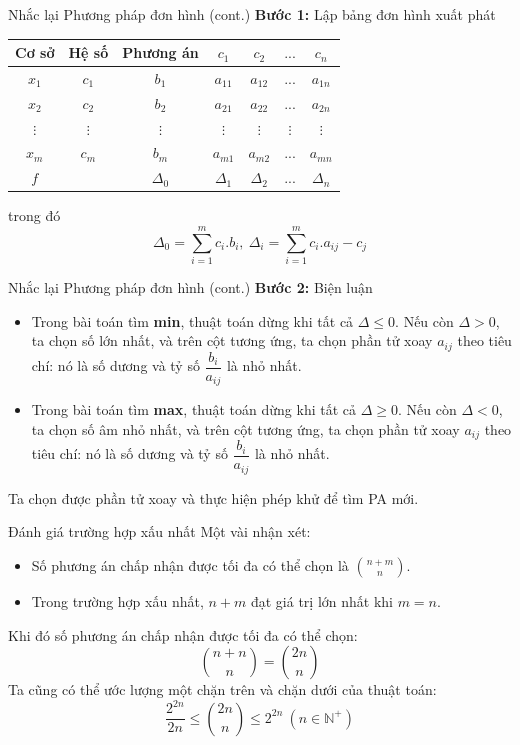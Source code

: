 \documentclass[10pt]{beamer}
\begin{document}
\begin{frame}{Nhắc lại Phương pháp đơn hình (cont.)}
\textbf{Bước 1:} Lập bảng đơn hình xuất phát
\begin{table}[H]
\centering
\begin{tabular}{|c|c|c|c|c|c|c|}
\hline
Cơ sở & Hệ số & Phương án & $c_1$ & $c_2$ & $...$ & $c_n$\\
\hline
$x_1$ & $c_1$ & $b_1$ & $a_{11}$ & $a_{12}$ & $...$ & $a_{1n}$ \\
$x_2$ & $c_2$ & $b_2$ & $a_{21}$ & $a_{22}$ & $...$ & $a_{2n}$ \\
$\vdots$ & $\vdots$ & $\vdots$ & $\vdots$ & $\vdots$ & $\vdots$ & $\vdots$\\
$x_m$ & $c_m$ & $b_m$ & $a_{m1}$ & $a_{m2}$ & $...$ & $a_{mn}$\\
\hline
$f$ & & $\Delta_0$ & $\Delta_1$ & $\Delta_2$ & $...$ & $\Delta_n$ \\
\hline
\end{tabular}
\end{table}
trong đó
$$
\Delta_0 = \sum^{m}_{i=1}c_{i}.b_i,\ \Delta_i = \sum^{m}_{i=1}c_i.a_{ij} - c_j
$$

\end{frame}

\begin{frame}{Nhắc lại Phương pháp đơn hình (cont.)}
\textbf{Bước 2:} Biện luận
\begin{itemize}
\item Trong bài toán tìm \textbf{min}, thuật toán dừng khi tất cả $\Delta \leq 0$. Nếu còn $\Delta > 0$, ta chọn số lớn nhất, và trên cột tương ứng, ta chọn phần tử xoay $a_{ij}$ theo tiêu chí: nó là số dương và tỷ số $\dfrac{b_{i}}{a_{ij}}$ là nhỏ nhất.
\item Trong bài toán tìm \textbf{max}, thuật toán dừng khi tất cả $\Delta \geq 0$. Nếu còn $\Delta < 0$, ta chọn số âm nhỏ nhất, và trên cột tương ứng, ta chọn phần tử xoay $a_{ij}$ theo tiêu chí: nó là số dương và tỷ số $\dfrac{b_{i}}{a_{ij}}$ là nhỏ nhất.
\end{itemize}
Ta chọn được phần tử xoay và thực hiện phép khử để tìm PA mới.
\end{frame}

\begin{frame}{Đánh giá trường hợp xấu nhất}
Một vài nhận xét:
\begin{itemize}
\item Số phương án chấp nhận được tối đa có thể chọn là $\displaystyle \binom{n + m}{n}$.
\item Trong trường hợp xấu nhất, $n + m$ đạt giá trị lớn nhất khi $m = n$.
\end{itemize}
Khi đó số phương án chấp nhận được tối đa có thể chọn:
$$
\displaystyle \binom{n + n}{n} = \binom{2n}{n}
$$
Ta cũng có thể ước lượng một chặn trên và chặn dưới của thuật toán\cite{Vanderbei2020}:
$$
\frac{2^{2n}}{2n} \leq \binom{2n}{n} \leq 2^{2n} \ (n \in \mathbb{N^+})
$$
\end{frame}
\end{document}
